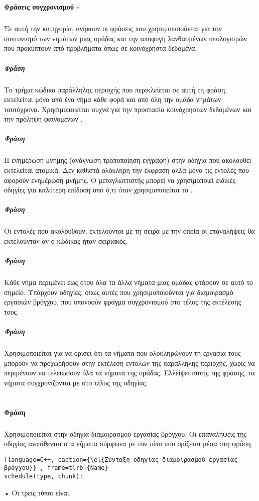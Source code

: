\ \\
\paragraph{Φράσεις συγχρονισμού - \emph{}}
\subparagraph{}
Σε αυτή την κατηγορία, ανήκουν οι φράσεις που χρησιμοποιούνται για τον συντονισμό των νημάτων μιας ομάδας και την αποφυγή λανθασμένων υπολογισμών που προκύπτουν από προβλήματα όπως \emph{} σε κοινόχρηστα δεδομένα.

\subparagraph{Φράση \emph{}}
\subparagraph{}
Το τμήμα κώδικα παράλληλης περιοχής που περικλείεται σε αυτή τη φράση, εκτελείται μόνο από ένα νήμα κάθε φορά και από όλη την ομάδα νημάτων ταυτόχρονα. Χρησιμοποιείται συχνά για την προστασία κοινόχρηστων δεδομένων και την πρόληψη φαινομένων \emph{}.

\subparagraph{Φράση \emph{}}
\subparagraph{}
H ενημέρωση μνήμης (ανάγνωση-τροποποίηση-εγγραφή) στην οδηγία που ακολουθεί εκτελείται ατομικά. Δεν καθιστά ολόκληρη την έκφραση \emph{} αλλα μόνο τις εντολές που αφορούν ενημέρωση μνήμης. Ο μεταγλωττιστής μπορεί να χρησιμοποιεί ειδικές οδηγίες \emph{} για καλύτερη επίδοση από ό,τι όταν χρησιμοποιείται το \emph{}.
      
\clearpage
\subparagraph{Φράση \emph{}}
\subparagraph{}
Οι εντολές που ακολουθούν, εκτελούνται με τη σειρά με την οποία οι επαναλήψεις θα εκτελούνταν αν ο κώδικας ήταν σειριακός.

\subparagraph{Φράση \emph{}}
\subparagraph{}
Kάθε νήμα περιμένει έως ότου όλα τα άλλα νήματα μιας ομάδας φτάσουν σε αυτό το σημείο. Υπάρχουν οδηγίες, όπως αυτές που χρησιμοποιούνται για διαμοιρασμό εργασιών βρόγχου, που υπονοούν φράγμα συγχρονισμού \emph{} στο τέλος της εκτέλεσης τους.

\subparagraph{Φράση \emph{}}
\subparagraph{}
Χρησιμοποιείται για να ορίσει ότι τα νήματα που ολοκληρώνουν τη εργασία τους μπορούν να προχωρήσουν στην εκτέλεση εντολών της παράλληλης περιοχής, χωρίς να περιμένουν να τελειώσουν όλα τα νήματα της ομάδας. Ελλείψει αυτής της φράσης, τα νήματα συγχρονίζονται με \emph{} στο τέλος της οδηγίας.
\ \\
\ \\
\paragraph{Φράση \emph{}}
\subparagraph{}
Χρησιμοποιείται στην οδηγία διαμοιρασμού εργασίας βρόγχου. Οι επαναλήψεις της οδηγίας ανατίθενται στα νήματα σύμφωνα με τον \emph{τύπο} που ορίζεται μέσα στη φράση.
\begin{lstlisting}[language=C++, caption={\el{Σύνταξη οδηγίας διαμοιρασμού εργασίας βρόγχου}} , frame=tlrb]{Name}
schedule(type, chunk): 
\end{lstlisting}
\clearpage
    •  Οι τρεις τύποι \emph{} είναι\cite{jakacorner}:\\
      
